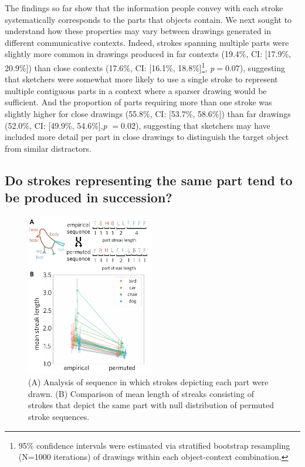\documentclass[10pt,letterpaper]{article}
\begin{document}
The findings so far show that the information people convey with each stroke systematically corresponds to the parts that objects contain. 
We next sought to understand how these properties may vary between drawings generated in different communicative contexts.
Indeed, strokes spanning multiple parts were slightly more common in drawings produced in far contexts (19.4\%, CI: [17.9\%, 20.9\%]) than close contexts (17.6\%, CI: [16.1\%, 18.8\%]\footnote{95\% confidence intervals were estimated via stratified bootstrap resampling (N=1000 iterations) of drawings within each object-context combination.}, \textit{p}$=0.07$), suggesting that sketchers were somewhat more likely to use a single stroke to represent multiple contiguous parts in a context where a sparser drawing would be sufficient.
And the proportion of parts requiring more than one stroke was slightly higher for close drawings (55.8\%, CI: [53.7\%, 58.6\%]) than far drawings (52.0\%, CI: [49.9\%, 54.6\%],\textit{p} $= 0.02$), suggesting that sketchers may have included more detail per part in close drawings to distinguish the target object from similar distractors. 


\subsection{Do strokes representing the same part tend to be produced in succession?}
\begin{figure}[t]
\centering
\includegraphics[width=0.5\textwidth]{figures/6_part_sequence.pdf}
\caption{(A) Analysis of sequence in which strokes depicting each part were drawn. (B) Comparison of mean length of streaks consisting of strokes that depict the same part with null distribution of permuted stroke sequences.}
\label{stroke_sequence_fig}
\end{figure}
\end{document}
